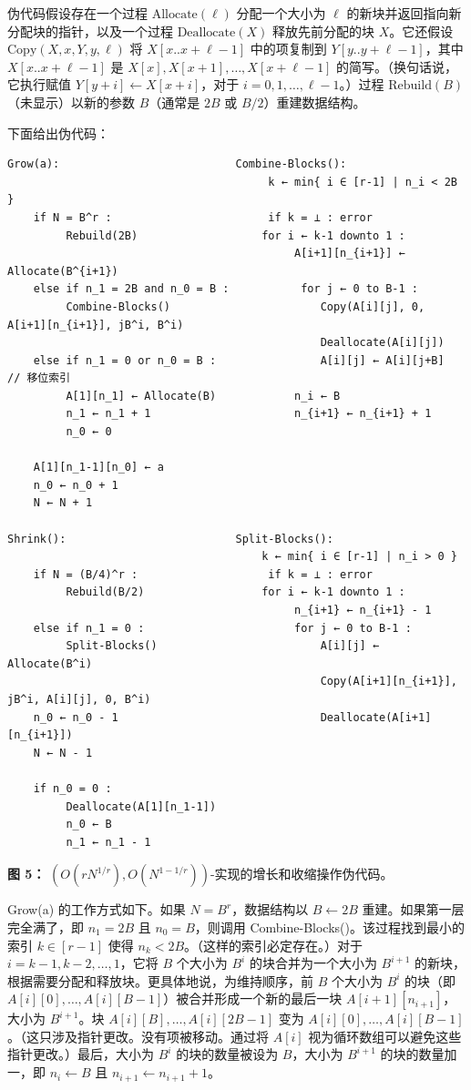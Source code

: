 \documentclass[12pt,a4paper]{ctexart}
\theoremstyle{remark}
\begin{document}
伪代码假设存在一个过程 $\text{Allocate}(\ell)$ 分配一个大小为 $\ell$ 的新块并返回指向新分配块的指针，以及一个过程 $\text{Deallocate}(X)$ 释放先前分配的块 $X$。它还假设 $\text{Copy}(X,x,Y,y,\ell)$ 将 $X[x..x+\ell-1]$ 中的项复制到 $Y[y..y+\ell-1]$，其中 $X[x..x+\ell-1]$ 是 $X[x],X[x+1],\ldots,X[x+\ell-1]$ 的简写。（换句话说，它执行赋值 $Y[y+i]\leftarrow X[x+i]$，对于 $i=0,1,\ldots,\ell-1$。）过程 $\text{Rebuild}(B)$（未显示）以新的参数 $B$（通常是 $2B$ 或 $B/2$）重建数据结构。

下面给出伪代码：

\begin{verbatim}
Grow(a):                           Combine-Blocks():
                                        k ← min{ i ∈ [r-1] | n_i < 2B }
    if N = B^r :                        if k = ⊥ : error
         Rebuild(2B)                   for i ← k-1 downto 1 :
                                            A[i+1][n_{i+1}] ← Allocate(B^{i+1})
    else if n_1 = 2B and n_0 = B :           for j ← 0 to B-1 :
         Combine-Blocks()                       Copy(A[i][j], 0, A[i+1][n_{i+1}], jB^i, B^i)
                                                Deallocate(A[i][j])
    else if n_1 = 0 or n_0 = B :                A[i][j] ← A[i][j+B]  // 移位索引
         A[1][n_1] ← Allocate(B)            n_i ← B
         n_1 ← n_1 + 1                      n_{i+1} ← n_{i+1} + 1
         n_0 ← 0

    A[1][n_1-1][n_0] ← a
    n_0 ← n_0 + 1
    N ← N + 1

Shrink():                          Split-Blocks():
                                       k ← min{ i ∈ [r-1] | n_i > 0 }
    if N = (B/4)^r :                    if k = ⊥ : error
         Rebuild(B/2)                  for i ← k-1 downto 1 :
                                            n_{i+1} ← n_{i+1} - 1
    else if n_1 = 0 :                       for j ← 0 to B-1 :
         Split-Blocks()                         A[i][j] ← Allocate(B^i)
                                                Copy(A[i+1][n_{i+1}], jB^i, A[i][j], 0, B^i)
    n_0 ← n_0 - 1                               Deallocate(A[i+1][n_{i+1}])
    N ← N - 1

    if n_0 = 0 :
         Deallocate(A[1][n_1-1])
         n_0 ← B
         n_1 ← n_1 - 1
\end{verbatim}

\textbf{图 5：} $(O(rN^{1/r}),O(N^{1-1/r}))$-实现的增长和收缩操作伪代码。

Grow(a) 的工作方式如下。如果 $N=B^r$，数据结构以 $B\leftarrow 2B$ 重建。如果第一层完全满了，即 $n_1=2B$ 且 $n_0=B$，则调用 Combine-Blocks()。该过程找到最小的索引 $k\in[r-1]$ 使得 $n_k<2B$。（这样的索引必定存在。）对于 $i=k-1,k-2,\ldots,1$，它将 $B$ 个大小为 $B^i$ 的块合并为一个大小为 $B^{i+1}$ 的新块，根据需要分配和释放块。更具体地说，为维持顺序，前 $B$ 个大小为 $B^i$ 的块（即 $A[i][0],\ldots,A[i][B-1]$）被合并形成一个新的最后一块 $A[i+1][n_{i+1}]$，大小为 $B^{i+1}$。块 $A[i][B],\ldots,A[i][2B-1]$ 变为 $A[i][0],\ldots,A[i][B-1]$。（这只涉及指针更改。没有项被移动。通过将 $A[i]$ 视为循环数组可以避免这些指针更改。）最后，大小为 $B^i$ 的块的数量被设为 $B$，大小为 $B^{i+1}$ 的块的数量加一，即 $n_i\leftarrow B$ 且 $n_{i+1}\leftarrow n_{i+1}+1$。
\end{document}

